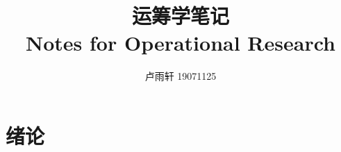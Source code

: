 \documentclass{ctexbook}
\title{运筹学笔记 \\
Notes for Operational Research}
\author{卢雨轩 19071125}
\begin{document}
\maketitle

\chapter*{绪论}
\end{document}
